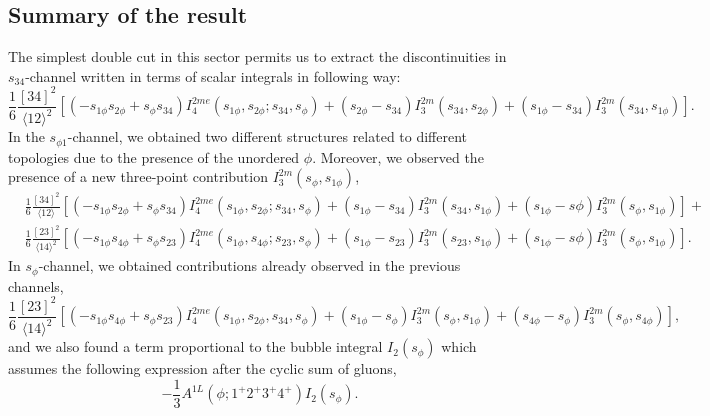 \subsection{Summary of the result}
The simplest double cut in this sector permits us to extract the discontinuities in $s_{34}$-channel written in terms of scalar integrals in following way:
$$
	\frac{1}{6}\frac{[34]^2}{\langle 12 \rangle^2}\left[(-s_{1\phi}s_{2\phi}+s_\phi s_{34})I_4^{2me}(s_{1\phi},s_{2\phi};s_{34},s_\phi)+(s_{2\phi}-s_{34})I_3^{2m}(s_{34},s_{2\phi})+(s_{1\phi}-s_{34})I_3^{2m}(s_{34},s_{1\phi}) \right].
$$
In the $s_{\phi1}$-channel, we obtained two different structures related to different topologies due to the presence of the unordered $\phi$. Moreover, we observed the presence of a new three-point contribution $I_{3}^{2m}(s_\phi,s_{1\phi})$,
\begin{align*}
	&\frac{1}{6}\frac{[34]^2}{\langle 12\rangle}\left[(-s_{1\phi}s_{2\phi}+s_\phi s_{34})I_4^{2me}(s_{1\phi},s_{2\phi};s_{34},s_\phi)+(s_{1\phi}-s_{34}) I_3^{2m}(s_{34},s_{1\phi})+(s_{1\phi}-s{\phi})I_{3}^{2m}(s_\phi,s_{1\phi})\right]+\\
	&\frac{1}{6}\frac{[23]^2}{\langle 14 \rangle^2} \left[(-s_{1\phi}s_{4\phi}+s_\phi s_{23})I_4^{2me}(s_{1\phi},s_{4\phi};s_{23},s_\phi)+(s_{1\phi}-s_{23}) I_3^{2m}(s_{23},s_{1\phi})+(s_{1\phi}-s{\phi})I_{3}^{2m}(s_\phi,s_{1\phi}) \right].
\end{align*}
In $s_{\phi}$-channel, we obtained contributions already observed in the previous channels,
$$
	\frac{1}{6}\frac{[23]^2}{\langle 14 \rangle^2}\left[(-s_{1\phi}s_{4\phi}+s_\phi s_{23}) I_4^{2me}(s_{1\phi},s_{2\phi},s_{34},s_\phi)+(s_{1\phi}-s_\phi)I_3^{2m}(s_\phi,s_{1\phi})+(s_{4\phi}-s_\phi) I_3^{2m}(s_\phi,s_{4\phi})\right],
$$
and we also found a term proportional to the bubble integral $I_2(s_{\phi})$ which assumes the following expression after the cyclic sum of gluons,
$$
	-\frac{1}{3}A^{1L}(\phi;1^+2^+3^+4^+) I_2(s_\phi).
$$

